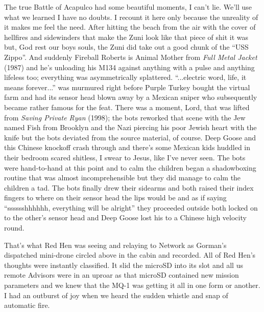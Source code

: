 \documentclass[13pt|draft]{report}
\begin{document}
The true Battle of Acapulco had some beautiful moments, I can't lie. We'll use what we learned I have no doubts. I recount it here only because the unreality of it makes me feel the need. After hitting the beach from the air with the cover of hellfires and sidewinders that make the Zuni look like that piece of shit it was but, God rest our boys souls, the Zuni did take out a good chunk of the ``USS Zippo''. And suddenly Fireball Roberts is Animal Mother from \textit{Full Metal Jacket} (1987) and he's unloading his M134 against anything with a pulse and anything lifeless too; everything was asymmetrically splattered. ``...electric word, life, it means forever...'' was murmured right before Purple Turkey bought the virtual farm and had its sensor head blown away by a Mexican sniper who subsequently became rather famous for the feat. There was a moment, Lord, that was lifted from \textit{Saving Private Ryan} (1998); the bots reworked that scene with the Jew named Fish from Brooklyn and the Nazi piercing his poor Jewish heart with the knife but the bots deviated from the source material, of course. Deep Goose and this Chinese knockoff crash through and there's some Mexican kids huddled in their bedroom scared shitless, I swear to Jesus, like I've never seen. The bots were hand-to-hand at this point and to calm the children began a shadowboxing routine that was almost incomprehensible but they did manage to calm the children a tad. The bots finally drew their sidearms and both raised their index fingers to where on their sensor head the lips would be and as if saying ``sssssshhhhhh, everything will be alright'' they proceeded outside both locked on to the other's sensor head and Deep Goose lost his to a Chinese high velocity round.

That's what Red Hen was seeing and relaying to Network as Gorman's dispatched mini-drone circled above in the cabin and recorded. All of Red Hen's thoughts were instantly classified. It slid the microSD into its slot and all us remote Advisors were in an uproar as that microSD contained new mission parameters and we knew that the MQ-1 was getting it all in one form or another. I had an outburst of joy when we heard the sudden whistle and snap of automatic fire.
\end{document}
